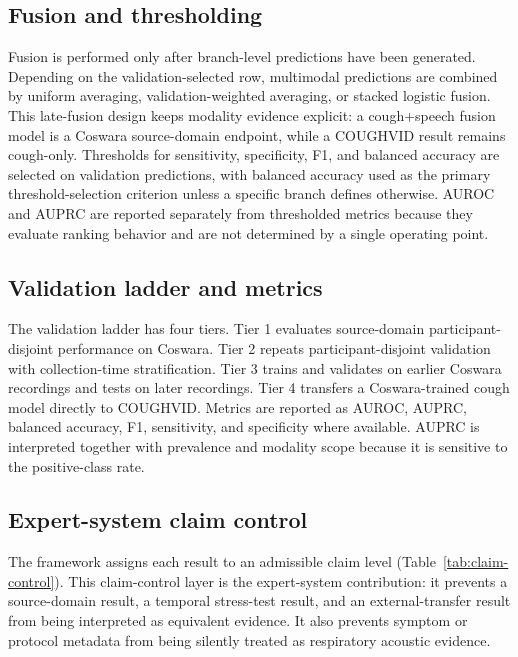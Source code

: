 \documentclass[preprint,12pt]{elsarticle}
\begin{document}
\subsection{Fusion and thresholding}

Fusion is performed only after branch-level predictions have been generated. Depending on the validation-selected row, multimodal predictions are combined by uniform averaging, validation-weighted averaging, or stacked logistic fusion. This late-fusion design keeps modality evidence explicit: a cough+speech fusion model is a Coswara source-domain endpoint, while a COUGHVID result remains cough-only. Thresholds for sensitivity, specificity, F1, and balanced accuracy are selected on validation predictions, with balanced accuracy used as the primary threshold-selection criterion unless a specific branch defines otherwise. AUROC and AUPRC are reported separately from thresholded metrics because they evaluate ranking behavior and are not determined by a single operating point.

\subsection{Validation ladder and metrics}

The validation ladder has four tiers. Tier 1 evaluates source-domain participant-disjoint performance on Coswara. Tier 2 repeats participant-disjoint validation with collection-time stratification. Tier 3 trains and validates on earlier Coswara recordings and tests on later recordings. Tier 4 transfers a Coswara-trained cough model directly to COUGHVID. Metrics are reported as AUROC, AUPRC, balanced accuracy, F1, sensitivity, and specificity where available. AUPRC is interpreted together with prevalence and modality scope because it is sensitive to the positive-class rate.

\subsection{Expert-system claim control}

The framework assigns each result to an admissible claim level (Table~\ref{tab:claim-control}). This claim-control layer is the expert-system contribution: it prevents a source-domain result, a temporal stress-test result, and an external-transfer result from being interpreted as equivalent evidence. It also prevents symptom or protocol metadata from being silently treated as respiratory acoustic evidence.
\end{document}
